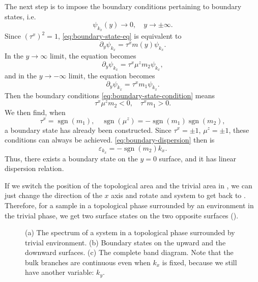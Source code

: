 \documentclass[hyperref, a4paper]{article}
\DeclareMathOperator{\sgn}{sgn}
\begin{document}
The next step is to impose the boundary conditions 
pertaining to boundary states, i.e. 
\begin{equation}
    \psi_{k_x}(y) \to 0, \quad y \to \pm \infty.
    \label{eq:boundary-state-condition}
\end{equation}
Since $(\tau^x)^2 = 1$, \eqref{eq:boundary-state-eq} is equivalent to 
\begin{equation}
    \partial_y \psi_{k_x} = \tau^x m(y) \psi_{k_x}.
\end{equation}
In the $y \to \infty$ limit, the equation becomes 
\begin{equation}
    \partial_y \psi_{k_x} = \tau^x \mu^z m_2 \psi_{k_x},
\end{equation}
and in the $y \to - \infty$ limit, the equation becomes 
\begin{equation}
    \partial_y \psi_{k_x} = \tau^x m_1 \psi_{k_x}.
\end{equation}
Then the boundary conditions \eqref{eq:boundary-state-condition} means 
\begin{equation}
    \tau^x \mu^z m_2 < 0, \quad \tau^x m_1 > 0.
\end{equation}
We then find, when 
\begin{equation}
    \tau^x = \sgn(m_1), \quad \sgn(\mu^z) = - \sgn(m_1) \sgn(m_2),
\end{equation}
a boundary state has already been constructed. 
Since $\tau^x = \pm 1$, $\mu^z = \pm 1$, 
these conditions can always be achieved. 
\eqref{eq:boundary-dispersion} then is 
\begin{equation}
    \varepsilon_{k_x} = - \sgn(m_2) k_x.
\end{equation}
Thus, there exists a boundary state on the $y = 0$ surface, 
and it has linear dispersion relation.

If we switch the position of the topological area and the trivial area 
in , 
we can just change the direction of the $x$ axis
and rotate and system to get back to .
Therefore, for a sample in a topological phase 
surrounded by an environment in the trivial phase, 
we get two surface states
on the two opposite surfaces ().

\begin{figure}
    \centering
    
    \caption{(a) The spectrum of a system in a topological phase surrounded by trivial environment.
    (b) Boundary states on the upward and the downward surfaces.
    (c) The complete band diagram.
    Note that the bulk branches are continuous even when $k_x$ is fixed,
    because we still have another variable: $k_y$.}
    \label{fig:total-spectrum}
\end{figure}
\end{document}
